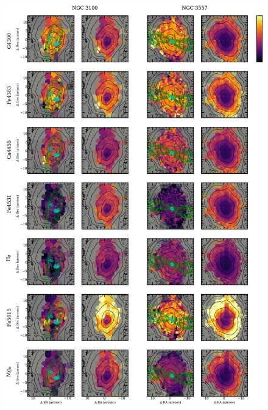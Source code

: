 		\begin{figure}
			\centering
			\includegraphics[height=0.94\textheight]{chapter4/vimos/abs4.png}
		\end{figure}
